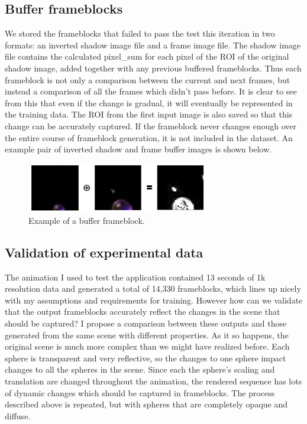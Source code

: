 \documentclass[conference]{IEEEtran}
\begin{document}
\subsection{Buffer frameblocks}
\label{subsec:buffer_frameblocks}
We stored the frameblocks that failed to pass the test this iteration in two formats:
an inverted shadow image file and a frame image file.
The shadow image file contains the calculated pixel\_sum for each pixel of the ROI of the original shadow image,
added together with any previous buffered frameblocks.
Thus each frameblock is not only a comparison between the current and next frames,
but instead a comparison of all the frames which didn't pass before.
It is clear to see from this that even if the change is gradual,
it will eventually be represented in the training data.
The ROI from the first input image is also saved so that this change can be accurately captured.
If the frameblock never changes enough over the entire course of frameblock generation,
it is not included in the dataset.
An example pair of inverted shadow and frame buffer images is shown below.

\begin{figure}[htbp]
\centerline{\includegraphics[width=8cm]{buffer_frameblock.png}}
\caption{Example of a buffer frameblock.}
\label{fig:buffer_frameblock}
\end{figure}

\subsection{Validation of experimental data}
\label{subsec:data_analysis}
The animation I used to test the application
contained 13 seconds of 1k resolution data and generated
a total of 14,330 frameblocks, which lines up nicely with my assumptions and
requirements for training. However how can we validate that the output frameblocks
accurately reflect the changes in the scene that should be captured?
I propose a comparison between these outputs and those generated from the same
scene with different properties.
As it so happens, the original scene is much more complex than we might have realized before.
Each sphere is transparent and very reflective,
so the changes to one sphere impact changes to all the spheres in the scene.
Since each the sphere's scaling and translation are changed throughout the
animation, the rendered sequence has lots of dynamic changes which should be
captured in frameblocks.
The process described above is repeated, but with
spheres that are completely opaque and diffuse.
\end{document}

